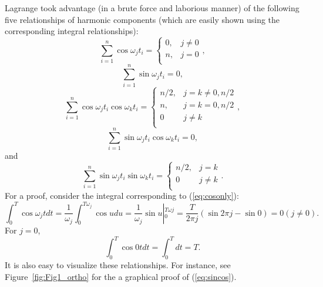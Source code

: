 Lagrange took advantage  (in a brute force and laborious manner) of the following five
relationships of harmonic components (which are easily shown using the corresponding integral 
relationships):
\begin{equation}
\sum^{n}_{i=1} \cos \omega_{j}t_{i} = \left\{ \begin{array}{cc} 0, & j \neq 0 \\ n, & j = 0\\
\end{array} \right.,
\label{eq:cosonly}
\end{equation}
\begin{equation}
\sum^{n}_{i=1}\sin \omega_{j}t_{i} = 0,
\end{equation}
\begin{equation}
\sum^{n}_{i=1} \cos \omega_{j}t_{i} \cos \omega_{k}t_{i} = 
\left\{ \begin{array}{ll} n/2, & j=k\neq 0,n/2\\n, & j=k=0, n/2\\ 0& j \neq k\\ \end{array} \right.,
\label{eq:coscos}
\end{equation}
\begin{equation}
\sum^{n}_{i=1} \sin \omega_{j}t_{i} \cos \omega_{k}t_{i} = 0,
\label{eq:sincos}
\end{equation}
and
\begin{equation}
\sum^{n}_{i=1} \sin \omega_{j}t_{i} \sin \omega_{k}t_{i} = 
\left\{ \begin{array}{ll} n/2, & j=k\\ 0& j \neq k\\ \end{array} \right. .
\label{eq:sinsin}
\end{equation}
For a proof, consider the integral corresponding to (\ref{eq:cosonly}):
\begin{equation}
\int^{T}_0 \cos \omega_{j} tdt = \frac{1}{\omega_{j}} \int^{T\omega_{j}}_{0} \cos udu = \frac{1}{\omega_{j}} \sin u \left |^{T \omega {j}}_0 = \frac{T}{2 \pi j} \right. \left( \sin 2 \pi j - \sin 0\right) = 0 \left( j \neq 0 \right).
\end{equation}	 
For $j = 0$,
\begin{equation}
\int^{T}_{0} \cos 0tdt = \int^{T}_{0}dt = T.	 
\end{equation}
It is also easy to visualize these relationships.  For instance, see Figure~\ref{fig:Fig1_ortho} for the a graphical proof of (\ref{eq:sincos}).

